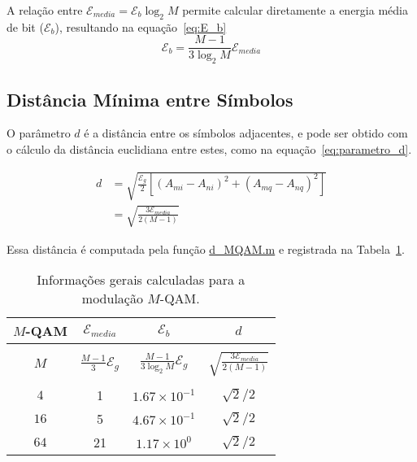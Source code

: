 A relação entre $\mathcal{E}_{media} = \mathcal{E}_b \log_2{M}$ permite calcular diretamente a energia média de bit ($\mathcal{E}_b$), resultando na equação~\ref{eq:E_b}
\begin{equation}
    \mathcal{E}_b = \frac{M-1}{3\log_2 M} \mathcal{E}_{media}
    \label{eq:E_b}
\end{equation}

\subsection{Distância Mínima entre Símbolos}
O parâmetro $d$ é a distância entre os símbolos adjacentes, e pode ser obtido com o cálculo da distância euclidiana entre estes, como na equação~\ref{eq:parametro_d}.

\begin{equation}
    \begin{split}
        d & = \sqrt{\frac{\mathcal{E}_g}{2}[(A_{mi} - A_{ni})^2 + (A_{mq} - A_{nq})^2]}\\
        & = \sqrt{\frac{3 \mathcal{E}_{media}}{2(M-1)}}
    \end{split}
    \label{eq:parametro_d}
\end{equation}

Essa distância é computada pela função \href{https://raw.githubusercontent.com/lucasabdalah/Courses-HWs/SCD/Sistemas%20de%20Comunicacoes%20Digitais/matlab/problema1/d_MQAM.m}{d\_MQAM.m} e registrada na Tabela~\ref{tab:Resume_QAM}.

\begin{table}[!ht]
    \centering
    \begin{tabular}{|c|c|c|c|}
        \hline
        $M$-QAM & $\mathcal{E}_{media}$ & $\mathcal{E}_{b}$ & $d$ \\ \hline
        & &  &  \\ 
        $M$ & $\frac{M-1}{3} \mathcal{E}_g$ & $ \frac{M-1}{3\log_2 M} \mathcal{E}_g$ & $\sqrt{\frac{3 \mathcal{E}_{media}}{2(M-1)}} $ \\ 
         &   &   &  \\ \hline
        $4$  & 1 & $1.67\times 10^{-1}$ & $\sqrt{2}/2$\\ \hline
        $16$ & 5 & $4.67\times 10^{-1}$ & $\sqrt{2}/2$\\ \hline
        $64$ & 21 & $1.17\times 10^{0}$ & $\sqrt{2}/2$\\ \hline
    \end{tabular}
    \caption{Informações gerais calculadas para a modulação $M$-QAM.}
    \label{tab:Resume_QAM}
\end{table}

